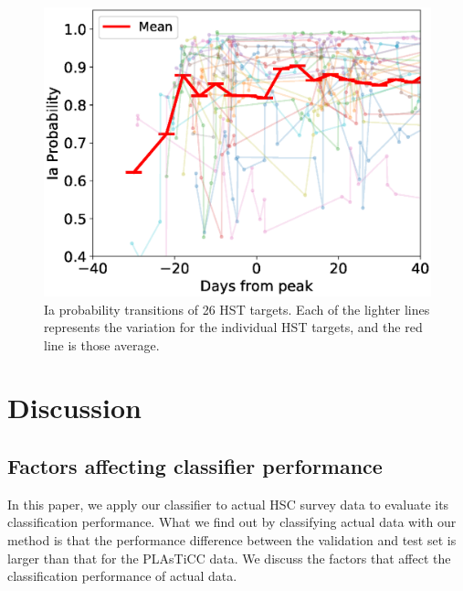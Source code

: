 \documentclass[proof]{pasj01}
\begin{document}
%
%
\begin{figure}[htbp]
  \begin{center}
     \includegraphics[width=\columnwidth]{figures/HST_DaysFromPeak_vs_IaProbability_200319.eps}
  \end{center}
  \caption{%
  Ia probability transitions of 26 HST targets. Each of the lighter lines represents the variation for the individual HST targets, and the red line is those average.
  }%
  \label{fig:HSTIaprob}
\end{figure}
%
%
\section{Discussion}
%
\subsection{Factors affecting classifier performance}
%
In this paper, we apply our classifier to actual HSC survey data to evaluate its classification performance.
What we find out by classifying actual data with our method is that the performance difference between the validation and test set is larger than that for the PLAsTiCC data.
We discuss the factors that affect the classification performance of actual data.
\end{document}
